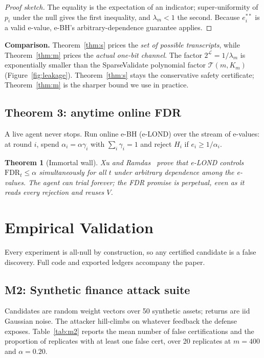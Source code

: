 \documentclass[sigconf]{acmart}
\theoremstyle{plain}
\newtheorem{theorem}{Theorem}[section]
\begin{document}
\begin{proof}[Proof sketch]
The equality is the expectation of an indicator; super-uniformity of $p_i$
under the null gives the first inequality, and $\lambda_m<1$ the second.
Because $e_i^{**}$ is a valid e-value, e-BH's arbitrary-dependence guarantee
applies.
\end{proof}

\textbf{Comparison.} Theorem~\ref{thm:s} prices the \emph{set of possible
transcripts}, while Theorem~\ref{thm:m} prices the \emph{actual one-bit
channel}. The factor $2^{\mathcal{L}}=1/\lambda_m$ is exponentially smaller
than the SparseValidate polynomial factor $\mathcal{T}(m,K_m)$
(Figure~\ref{fig:leakage}). Theorem~\ref{thm:s} stays the conservative
safety certificate; Theorem~\ref{thm:m} is the sharper bound we use in
practice.

\subsection{Theorem 3: anytime online FDR}\label{sec:theorem-3}

A live agent never stops. Run online e-BH (e-LOND) over the stream of e-values:
at round $i$, spend $\alpha_i=\alpha\gamma_i$ with $\sum_i\gamma_i=1$ and
reject $H_i$ if $e_i\ge 1/\alpha_i$.

\begin{theorem}[Immortal wall]\label{thm:3}
Xu and Ramdas~\cite{xu2024} prove that e-LOND controls
$\mathrm{FDR}_t\le\alpha$ simultaneously for all $t$ under arbitrary
dependence among the e-values. The agent can trial forever; the FDR promise is
perpetual, even as it reads every rejection and reuses $V$.
\end{theorem}

\section{Empirical Validation}\label{sec:empirical}

Every experiment is all-null by construction, so any certified candidate is a
false discovery. Full code and exported ledgers accompany the paper.

\subsection{M2: Synthetic finance attack suite}\label{sec:m2}

Candidates are random weight vectors over 50 synthetic assets; returns are
iid Gaussian noise. The attacker hill-climbs on whatever feedback the defense
exposes. Table~\ref{tab:m2} reports the mean number of false certifications
and the proportion of replicates with at least one false cert, over 20
replicates at $m=400$ and $\alpha=0.20$.
\end{document}
